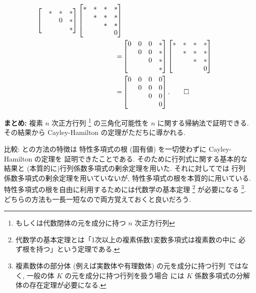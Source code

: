 \documentclass[12pt,twoside]{jarticle}
\begin{document}
\begin{align*}
\begin{bmatrix}
      & * & * & * \\
      &   & 0 & * \\
      &   &   & * \\
  \end{bmatrix}
  \begin{bmatrix}
    * & * & * & * \\
      & * & * & * \\
      &   & * & * \\
      &   &   & 0 \\
  \end{bmatrix}
  \\
  = &
  \begin{bmatrix}
    0 & 0 & 0 & * \\
      & 0 & 0 & * \\
      &   & 0 & * \\
      &   &   & * \\
  \end{bmatrix}
  \begin{bmatrix}
    * & * & * & * \\
      & * & * & * \\
      &   & * & * \\
      &   &   & 0 \\
  \end{bmatrix}
  \\
  = &
  \begin{bmatrix}
    0 & 0 & 0 & 0 \\
      & 0 & 0 & 0 \\
      &   & 0 & 0 \\
      &   &   & 0 \\
  \end{bmatrix}.
  \qed
\end{align*}

\bigskip
\noindent
{\large {\bf まとめ:} 複素 $n$ 次正方行列%
  \footnote{もしくは代数閉体の元を成分に持つ $n$ 次正方行列}
  の三角化可能性を $n$ に関する帰納法で証明できる.
  その結果から Cayley-Hamilton の定理がただちに導かれる.}

\bigskip
\noindent
比較: との方法の特徴は
特性多項式の根 (固有値) を一切使わずに Cayley-Hamilton の定理を
証明できたことである.  
そのために行列式に関する基本的な結果と
(本質的に)行列係数多項式の剰余定理を用いた.  
それに対してでは
行列係数多項式の剰余定理を用いていないが, 
特性多項式の根を本質的に用いている.  
特性多項式の根を自由に利用するためには代数学の基本定理%
\footnote{代数学の基本定理とは「1次以上の複素係数1変数多項式は複素数の中に
  必ず根を持つ」という定理である.}
が必要になる%
\footnote{複素数体の部分体 (例えば実数体や有理数体) の元を成分に持つ行列
  ではなく, 一般の体 $K$ の元を成分に持つ行列を扱う場合
  には $K$ 係数多項式の分解体の存在定理が必要になる.}.  %
どちらの方法も一長一短なので両方覚えておくと良いだろう.
\end{document}
